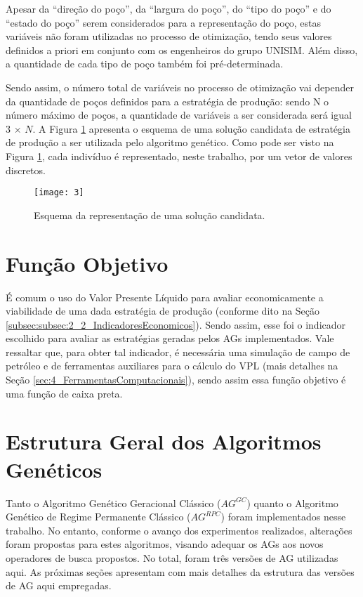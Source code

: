 Apesar da “direção do poço”, da “largura do poço”, do “tipo do poço” e do “estado do poço” serem considerados para a representação do poço, estas variáveis não foram utilizadas no processo de otimização, tendo seus valores definidos a priori em conjunto com os engenheiros do grupo UNISIM. Além disso, a quantidade de cada tipo de poço também foi pré-determinada. 

Sendo assim, o número total de variáveis no processo de otimização vai depender da quantidade de poços definidos para a estratégia de produção: sendo N o número máximo de poços, a quantidade de variáveis a ser considerada será igual 3 $\times$ $N$. A Figura \ref{fig:fig3_1} apresenta o esquema de uma solução candidata de estratégia de produção a ser utilizada pelo algoritmo genético. Como pode ser visto na Figura \ref{fig:fig3_1}, cada indivíduo é representado, neste trabalho, por um vetor de valores discretos.

\begin{figure}[!htbp]
  \centering
  \texttt{[image: 3]}
  \caption{Esquema da representação de uma solução candidata.}
  \label{fig:fig3_1}
\end{figure}

\section{Função Objetivo}
\label{sec:3_FuncaoObjetivo}
É comum o uso do Valor Presente Líquido para avaliar economicamente a viabilidade de uma dada estratégia de produção (conforme dito na Seção \ref{subsec:subsec:2_2_IndicadoresEconomicos}). Sendo assim, esse foi o indicador escolhido para avaliar as estratégias geradas pelos AGs implementados. Vale ressaltar que, para obter tal indicador, é necessária uma simulação de campo de petróleo e de ferramentas auxiliares para o cálculo do VPL (mais detalhes na Seção \ref{sec:4_FerramentasComputacionais}), sendo assim essa função objetivo é uma função de caixa preta. 

\section{Estrutura Geral dos Algoritmos Genéticos}

Tanto o Algoritmo Genético Geracional Clássico ($AG^{GC}$) quanto o Algoritmo Genético de Regime Permanente Clássico ($AG^{RPC}$) foram implementados nesse trabalho. No entanto, conforme o avanço dos experimentos realizados, alterações foram propostas para estes algoritmos, visando adequar os AGs aos novos operadores de busca propostos.  No total, foram três versões de AG utilizadas aqui.  As próximas seções apresentam com mais detalhes da estrutura das versões de AG aqui empregadas.

